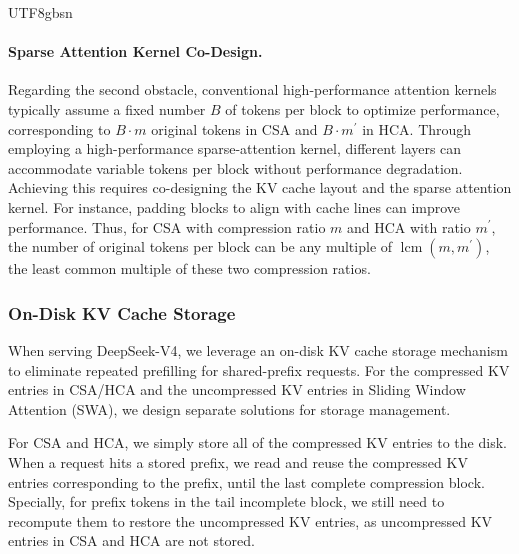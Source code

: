 \documentclass[11pt, a4paper, logo, copyright, nonumbering]{deepseek}
\newcommand{\dsviv}{DeepSeek-V4}
\newcommand{\hca}{HCA}
\newcommand{\csa}{CSA}
\begin{document}
\begin{CJK*}{UTF8}{gbsn}
\paragraph{Sparse Attention Kernel Co-Design.}
Regarding the second obstacle, conventional high-performance attention kernels typically assume a fixed number $B$ of tokens per block to optimize performance, corresponding to $B \cdot m$ original tokens in \csa{} and $B \cdot m^\prime$ in \hca{}. 
Through employing a high-performance sparse-attention kernel, different layers can accommodate variable tokens per block without performance degradation. 
Achieving this requires co-designing the KV cache layout and the sparse attention kernel. 
For instance, padding blocks to align with cache lines can improve performance. 
Thus, for \csa{} with compression ratio $m$ and \hca{} with ratio $m^{\prime}$, the number of original tokens per block can be any multiple of $\operatorname{lcm}(m,m^{\prime})$, the least common multiple of these two compression ratios.

\subsubsection{On-Disk KV Cache Storage}
When serving \dsviv{}, we leverage an on-disk KV cache storage mechanism to eliminate repeated prefilling for shared-prefix requests. 
For the compressed KV entries in \csa{}/\hca{} and the uncompressed KV entries in Sliding Window Attention (SWA), we design separate solutions for storage management.

For \csa{} and \hca{}, we simply store all of the compressed KV entries to the disk.
When a request hits a stored prefix, we read and reuse the compressed KV entries corresponding to the prefix, until the last complete compression block.
Specially, for prefix tokens in the tail incomplete block, we still need to recompute them to restore the uncompressed KV entries, as uncompressed KV entries in \csa{} and \hca{} are not stored.


\end{CJK*}
\end{document}
